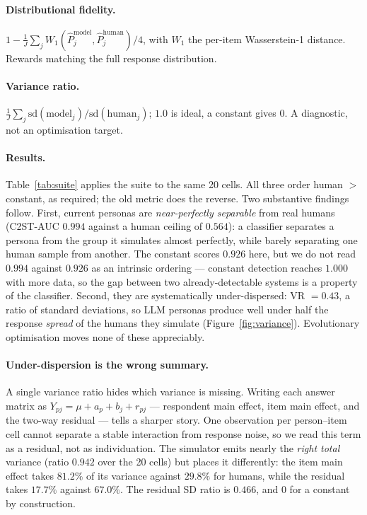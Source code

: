 \documentclass[11pt]{article}
\begin{document}
\paragraph{Distributional fidelity.} $1 - \frac{1}{J}\sum_j
W_1(\hat P_j^{\text{model}}, \hat P_j^{\text{human}})/4$, with $W_1$ the per-item
Wasserstein-1 distance. Rewards matching the full response distribution.

\paragraph{Variance ratio.} $\frac{1}{J}\sum_j \mathrm{sd}(\text{model}_j) /
\mathrm{sd}(\text{human}_j)$; $1.0$ is ideal, a constant gives $0$. A diagnostic,
not an optimisation target.

\paragraph{Results.} Table~\ref{tab:suite} applies the suite to the same 20
cells. All three order human $>$ constant, as required; the old metric does the
reverse. Two substantive findings follow. First, current personas are
\emph{near-perfectly separable} from real humans (C2ST-AUC $0.994$ against a
human ceiling of $0.564$): a classifier separates a persona from the group it
simulates almost perfectly, while barely separating one human sample from
another. The constant scores $0.926$ here, but we do not read $0.994$ against
$0.926$ as an intrinsic ordering --- constant detection reaches $1.000$ with
more data, so the gap between two already-detectable systems is a property of
the classifier. Second, they are systematically under-dispersed: VR
$=0.43$, a ratio of standard deviations, so LLM personas produce well under half
the response \emph{spread} of the humans they simulate
(Figure~\ref{fig:variance}). Evolutionary optimisation moves
none of these appreciably.

\paragraph{Under-dispersion is the wrong summary.} A single variance ratio hides
which variance is missing. Writing each answer matrix as
$Y_{pj}=\mu+a_p+b_j+r_{pj}$ --- respondent main effect, item main effect, and
the two-way residual --- tells a sharper story. One observation per
person--item cell cannot separate a stable interaction from response noise, so
we read this term as a residual, not as individuation. The simulator emits
nearly the \emph{right total}
variance (ratio $0.942$ over the 20 cells) but places it differently: the item
main effect takes $81.2\%$ of its variance against $29.8\%$ for humans, while
the residual takes $17.7\%$ against $67.0\%$. The residual SD ratio is $0.466$,
and $0$ for a constant by construction.
\end{document}
